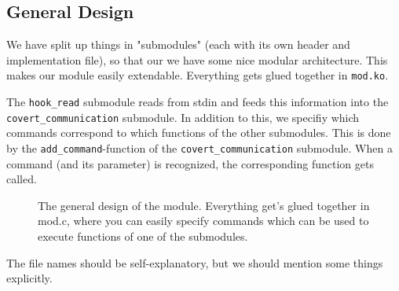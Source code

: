 \documentclass[10pt, letterpaper]{article}
\begin{document}
\subsection{General Design}

We have split up things in "submodules" (each with its own header and implementation file), so
that our we have some nice modular architecture. This makes our module easily extendable. Everything gets glued together in \texttt{mod.ko}.

The \texttt{hook\_read} submodule reads from stdin and feeds this information into the \linebreak \texttt{covert\_communication} submodule. In addition to this, we specifiy which commands correspond to which functions of the other submodules. This is done by the \texttt{add\_command}-function of the  \texttt{covert\_communication} submodule. When a command (and its parameter) is recognized, the corresponding function gets called.

 \begin{figure}[ht]
  \centering
  
  \caption{The general design of the module. Everything get's glued together in mod.c, where you can easily specify commands which can be used to execute functions of one of the submodules.}
  \label{fig:module-decomposition}
\end{figure}
The file names should be self-explanatory, but we should mention some things explicitly.
\end{document}
